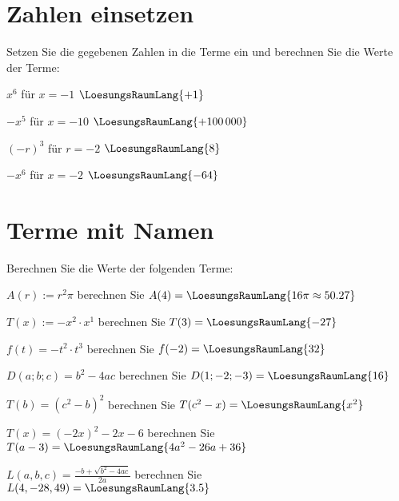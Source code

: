 \newpage


\section{Zahlen einsetzen}
Setzen Sie die gegebenen Zahlen in die Terme ein und berechnen Sie die
Werte der Terme:

\begin{bbwAufgabenBlock}
\item $x^6$ für $x=-1$ $\LoesungsRaumLang{+1}$
\item $-x^5$ für $x=-10$ $\LoesungsRaumLang{+100\,000}$
\item $(-r)^3$ für $r=-2$ $\LoesungsRaumLang{8}$
\item $-x^6$ für $x=-2$ $\LoesungsRaumLang{-64}$
\end{bbwAufgabenBlock}
\newpage

\section{Terme mit Namen}
Berechnen Sie die Werte der folgenden Terme:

\begin{bbwAufgabenBlock}
\item $A(r):=r^2\pi$ berechnen Sie $A(4)= \LoesungsRaumLang{16\pi\approx{}50.27}$
\item $T(x):=-x^2\cdot{}x^1$ berechnen Sie $T(3)= \LoesungsRaumLang{-27}$
\item $f(t)=-t^2\cdot{}t^3$ berechnen Sie $f(-2)= \LoesungsRaumLang{32}$
\item $D(a;b;c)=b^2-4ac$ berechnen Sie $D(1;-2;-3)= \LoesungsRaumLang{16}$\newpage
\item $T(b)=(c^2-b)^2$ berechnen Sie $T(c^2-x)= \LoesungsRaumLang{x^2}$
\item $T(x)=(-2x)^2 -2x -6$ berechnen Sie $T(a-3)= \LoesungsRaumLang{4a^2-26a+36}$
\item $L(a,b,c)=\frac{-b+\sqrt{b^2-4ac}}{2a}$ berechnen Sie $L(4, -28, 49)= \LoesungsRaumLang{3.5}$
\end{bbwAufgabenBlock}
\newpage%

